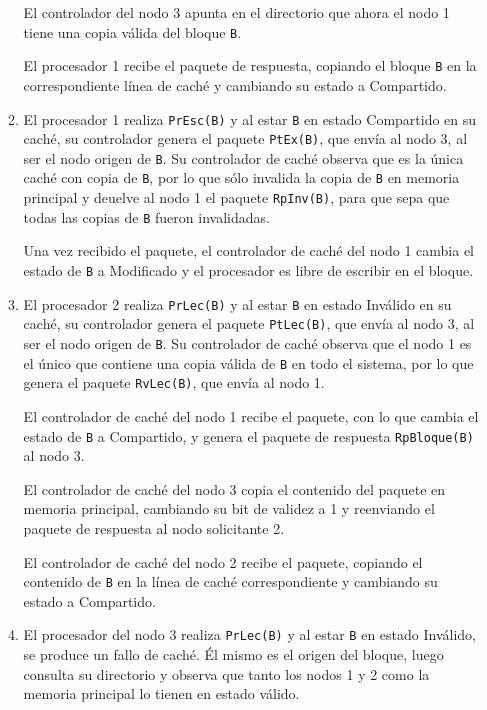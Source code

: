 \begin{ejercicio}
\begin{enumerate}
\begin{enumerate}
        El controlador del nodo 3 apunta en el directorio que ahora el nodo 1 tiene una copia válida del bloque \verb|B|.

        El procesador 1 recibe el paquete de respuesta, copiando el bloque \verb|B| en la correspondiente línea de caché y cambiando su estado a Compartido.

        \item El procesador 1 realiza \verb|PrEsc(B)| y al estar \verb|B| en estado Compartido en su caché, su controlador genera el paquete \verb|PtEx(B)|, que envía al nodo 3, al ser el nodo origen de \verb|B|. Su controlador de caché observa que es la única caché con copia de \verb|B|, por lo que sólo invalida la copia de \verb|B| en memoria principal y deuelve al nodo 1 el paquete \verb|RpInv(B)|, para que sepa que todas las copias de \verb|B| fueron invalidadas.

            Una vez recibido el paquete, el controlador de caché del nodo 1 cambia el estado de \verb|B| a Modificado y el procesador es libre de escribir en el bloque.

        \item El procesador 2 realiza \verb|PrLec(B)| y al estar \verb|B| en estado Inválido en su caché, su controlador genera el paquete \verb|PtLec(B)|, que envía al nodo 3, al ser el nodo origen de \verb|B|. Su controlador de caché observa que el nodo 1 es el único que contiene una copia válida de \verb|B| en todo el sistema, por lo que genera el paquete \verb|RvLec(B)|, que envía al nodo 1.

            El controlador de caché del nodo 1 recibe el paquete, con lo que cambia el estado de \verb|B| a Compartido, y genera el paquete de respuesta \verb|RpBloque(B)| al nodo 3.

            El controlador de caché del nodo 3 copia el contenido del paquete en memoria principal, cambiando su bit de validez a 1 y reenviando el paquete de respuesta al nodo solicitante 2.

            El controlador de caché del nodo 2 recibe el paquete, copiando el contenido de \verb|B| en la línea de caché correspondiente y cambiando su estado a Compartido.
        
        \item El procesador del nodo 3 realiza \verb|PrLec(B)| y al estar \verb|B| en estado Inválido, se produce un fallo de caché. Él mismo es el origen del bloque, luego consulta su directorio y observa que tanto los nodos 1 y 2 como la memoria principal lo tienen en estado válido.


\end{enumerate}
\end{enumerate}
\end{ejercicio}
